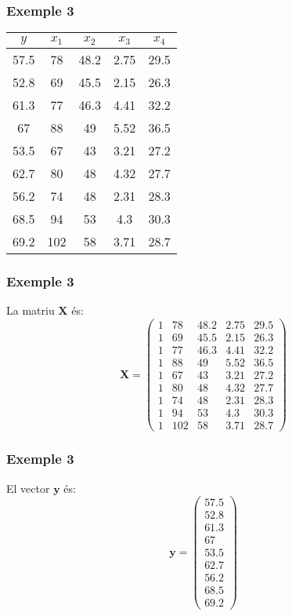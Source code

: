 \documentclass[12pt,t]{beamer}
\theoremstyle{plain}
\theoremstyle{definition}
\begin{document}
\begin{frame}
\frametitle{Exemple 3}

\begin{center}\begin{tabular}{|c|c|c|c|c|}\hline
$y$ & $x_1$ & $x_2$ & $x_3$ & $x_4$\\\hline
57.5&78&48.2&2.75&29.5\\ 52.8&69&45.5&2.15&26.3\\
61.3&77&46.3&4.41&32.2\\ 67&88&49&5.52&36.5\\ 53.5&67&43&3.21&27.2\\
62.7&80&48&4.32&27.7\\ 56.2&74&48&2.31&28.3\\ 68.5&94&53&4.3&30.3\\
69.2&102&58&3.71&28.7\\\hline\end{tabular}\end{center}

\end{frame}
\begin{frame}
\frametitle{Exemple 3}

La matriu $\mathbf{X}$ és:
$$
\mathbf{X}=\left(
\begin{array}{ccccc}
1&78&48.2&2.75&29.5\\
1&69&45.5&2.15&26.3\\
1&77&46.3&4.41&32.2\\
1&88&49&5.52&36.5\\
1&67&43&3.21&27.2\\
1&80&48&4.32&27.7\\
1&74&48&2.31&28.3\\
1&94&53&4.3&30.3\\
1&102&58&3.71&28.7
\end{array}
\right)
$$
\end{frame}

\begin{frame}
\frametitle{Exemple 3}
El vector $\mathbf{y}$ és:
$$
\mathbf{y}=\left(
\begin{array}{c}
57.5\\ 52.8\\ 61.3\\ 67\\ 53.5\\ 62.7\\ 56.2\\ 68.5\\ 69.2
\end{array}
\right)
$$
\end{frame}
\end{document}
